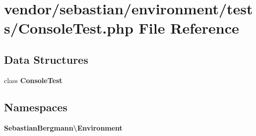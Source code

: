 \section{vendor/sebastian/environment/tests/\+Console\+Test.php File Reference}
\label{_console_test_8php}
\subsection*{Data Structures}
\begin{DoxyCompactItemize}
\item 
class {\bf Console\+Test}
\end{DoxyCompactItemize}
\subsection*{Namespaces}
\begin{DoxyCompactItemize}
\item 
 {\bf Sebastian\+Bergmann\textbackslash{}\+Environment}
\end{DoxyCompactItemize}

